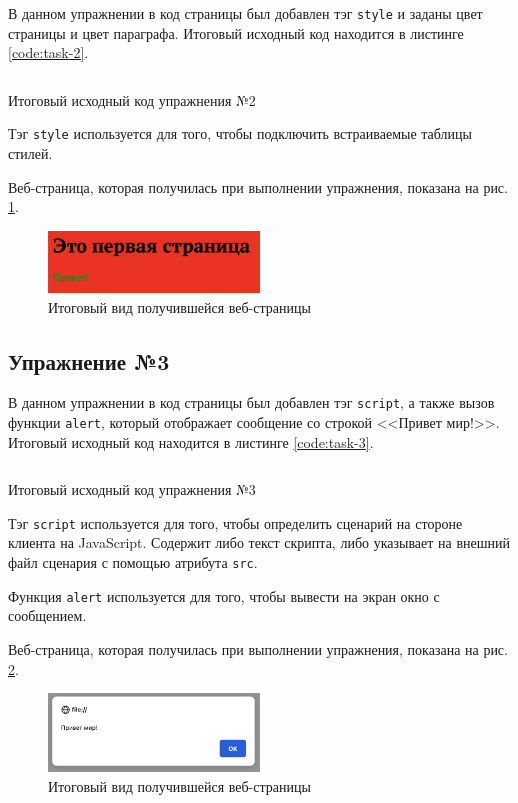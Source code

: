 \documentclass[a4paper, 14pt]{extarticle}
\newenvironment{code}{\captionsetup{type=listing}}{}
\begin{document}
В данном упражнении в код страницы был добавлен тэг \texttt{style} и заданы
цвет страницы и цвет параграфа. Итоговый исходный код находится в листинге
\ref{code:task-2}.

\begin{code}
  \inputminted{html}{../task-2/Sample02.html}
  \caption{Итоговый исходный код упражнения №2}
  \label{code:task-2}
\end{code}

Тэг \texttt{style} используется для того, чтобы подключить встраиваемые таблицы
стилей.

Веб-страница, которая получилась при выполнении упражнения, показана на рис.
\ref{fig:task-2}.

\begin{figure}[H]
  \centering
  \includegraphics[width=0.5\textwidth]{images/task-2.png}
  \caption{Итоговый вид получившейся веб-страницы}
  \label{fig:task-2}
\end{figure}

\subsection{Упражнение №3}

В данном упражнении в код страницы был добавлен тэг \texttt{script}, а также
вызов функции \texttt{alert}, который отображает сообщение со строкой <<Привет
мир!>>. Итоговый исходный код находится в листинге \ref{code:task-3}.

\begin{code}
  \inputminted{html}{../task-3/Sample03.html}
  \caption{Итоговый исходный код упражнения №3}
  \label{code:task-3}
\end{code}

Тэг \texttt{script} используется для того, чтобы определить сценарий на стороне
клиента на JavaScript. Содержит либо текст скрипта, либо указывает на внешний
файл сценария с помощью атрибута \texttt{src}.

Функция \texttt{alert} используется для того, чтобы вывести на экран окно с
сообщением.

Веб-страница, которая получилась при выполнении упражнения, показана на рис.
\ref{fig:task-3}.

\begin{figure}[H]
  \centering
  \includegraphics[width=0.5\textwidth]{images/task-3.png}
  \caption{Итоговый вид получившейся веб-страницы}
  \label{fig:task-3}
\end{figure}
\end{document}
